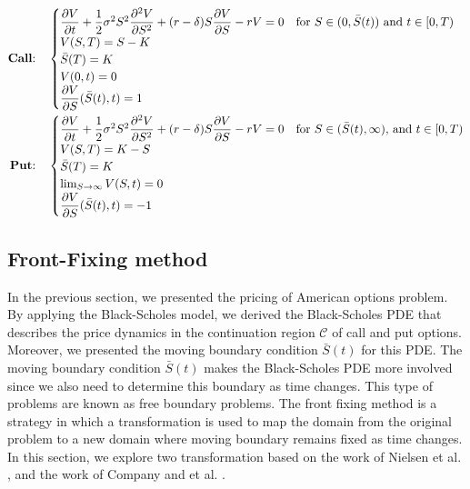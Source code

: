 \begin{subequations} \label{eq:blackscholes:preliminaries:american_options_pde_free_boundary_problem_full}
  \begin{align}
    \text{\textbf{Call}:} \quad &
    \begin{cases}
      \dfrac{\partial{V}}{\partial{t}} + \dfrac{1}{2}\sigma^{2} S^2 \dfrac{\partial^2{V}}{\partial{S}^2} + (r - \delta)S\dfrac{\partial{V}}{\partial{S}} - rV = 0 & \text{for $S \in (0,\bar{S}(t))$ and $t \in [0, T)$} \\ 
      V(S, T) = S - K \\
      \bar{S}(T) = K \\ 
      V(0, t) = 0 \\
      \dfrac{\partial{V}}{\partial{S}}(\bar{S}(t), t) = 1
    \end{cases} \\
    \text{\textbf{Put}:} \quad &
    \begin{cases}
      \dfrac{\partial{V}}{\partial{t}} + \dfrac{1}{2}\sigma^{2} S^2 \dfrac{\partial^2{V}}{\partial{S}^2} + (r - \delta)S\dfrac{\partial{V}}{\partial{S}} - rV = 0 & \text{for $S \in (\bar{S}(t), \infty)$, and $t \in [0, T)$} \\
      V(S, T) = K - S \\
      \bar{S}(T) = K \\ 
      \lim_{S\rightarrow\infty}V(S, t) = 0 \\ 
      \dfrac{\partial{V}}{\partial{S}}(\bar{S}(t), t) = -1
    \end{cases}
  \end{align}
\end{subequations}
\subsection{Front-Fixing method}
In the previous section, we presented the pricing of American options problem.
By applying the Black-Scholes model, we derived the Black-Scholes PDE that
describes the price dynamics in the continuation region $\mathcal{C}$ of call
and put options. Moreover, we presented the moving boundary condition
$\bar{S}(t)$ for this PDE. The moving boundary condition $\bar{S}(t)$ makes the
Black-Scholes PDE more involved since we also need to determine this boundary
as time changes. This type of problems are known as free boundary problems. The
front fixing method is a strategy in which a transformation is used to map the  domain from the original problem to a new domain where moving boundary remains fixed as time changes. In this section, we explore two transformation based on the work of Nielsen et al. \cite{nielsen_2001}, and the work of Company and et al. \cite{company_egorova_jodar_2014}.
